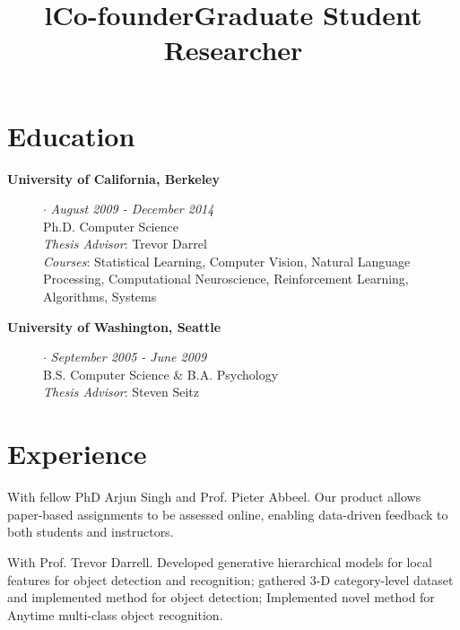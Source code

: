 \documentclass[line, margin]{res}
\title{l}\\
\begin{document}
\newsectionwidth{1in}

\address{\small{\textcolor{MidnightBlue}{http://sergeykarayev.com} $\cdot$ \textcolor{MidnightBlue}{sergeykarayev@gmail.com} $\cdot$ Updated 7 January 2015}}

\begin{resume}

\section{\sc Education}
\begin{description}
\item[{\bf University of California, Berkeley}] $\cdot$ {\it August 2009 - December 2014}
\\Ph.D. Computer Science
\\\emph{Thesis Advisor}: Trevor Darrel
\\\emph{Courses}: Statistical Learning, Computer Vision, Natural Language Processing, Computational Neuroscience, Reinforcement Learning, Algorithms, Systems

\item[{\bf University of Washington, Seattle}] $\cdot$ {\it September 2005 - June 2009}
\\B.S. Computer Science \& B.A. Psychology
\\\emph{Thesis Advisor}: Steven Seitz
\end{description}

\section{\sc Experience}

\title{\bf Co-founder}
\begin{position}
With fellow PhD Arjun Singh and Prof. Pieter Abbeel.
Our product allows paper-based assignments to be assessed online, enabling data-driven feedback to both students and instructors.
\end{position}

\title{\bf Graduate Student Researcher}
\begin{position}
With Prof. Trevor Darrell. Developed generative hierarchical models for local features for object detection and recognition; gathered 3-D category-level dataset and implemented  method for object detection; Implemented novel method for Anytime multi-class object recognition.
\end{position}


\end{resume}
\end{document}
